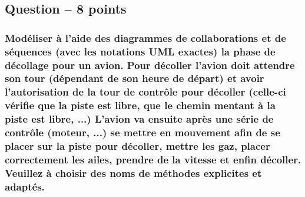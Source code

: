 \subsection{Question – 8 points}



\subsubsection[Fournir un diagramme de collaboration et de séquence complets sur un aéroport]{Modéliser à l'aide des diagrammes de collaborations et de séquences (avec les notations UML exactes) la phase de décollage pour un avion. Pour décoller l'avion doit attendre son tour (dépendant de son heure de départ) et avoir l'autorisation de la tour de contrôle pour décoller (celle-ci vérifie que la piste est libre, que le chemin mentant à la piste est libre, ...) L'avion va ensuite après une série de contrôle (moteur, ...) se mettre en mouvement afin de se placer sur la piste pour décoller, mettre les gaz, placer correctement les ailes, prendre de la vitesse et enfin décoller. Veuillez à choisir des noms de méthodes explicites et adaptés.}
\begin{center}
    \color[rgb]{0,0.48,0.58}
\end{center}
